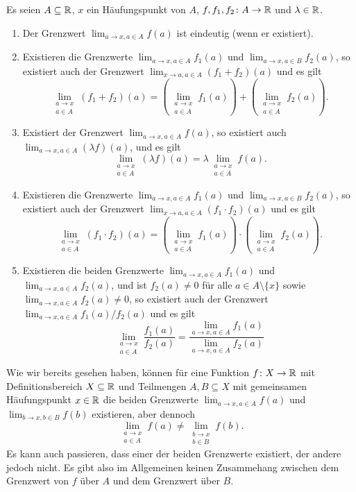 \documentclass[a4paper,10pt]{article}
\begin{document}
\begin{prop}
 Es seien $A \subseteq \mathbb{R}$, $x$ ein Häufungspunkt von $A$, $f, f_1, f_2 \colon A \to \mathbb{R}$ und $\lambda \in \mathbb{R}$.
 \begin{enumerate}
  \item
   Der Grenzwert $\lim_{a \to x, a \in A} f(a)$ ist eindeutig (wenn er existiert).
  \item
   Existieren die Grenzwerte $\lim_{a \to x, a \in A} f_1(a)$ und $\lim_{a \to x, a \in B} f_2(a)$, so existiert auch der Grenzwert $\lim_{x \to a, a \in A} (f_1 + f_2)(a)$ und es gilt
   \[
    \lim_{\substack{a \to x \\ a \in A}} (f_1 + f_2)(a)
    =
    \left( \lim_{\substack{a \to x \\ a \in A}} f_1(a) \right)
    + \left( \lim_{\substack{a \to x \\ a \in A}} f_2(a) \right).
   \]
  \item
   Existiert der Grenzwert $\lim_{a \to x, a \in A} f(a)$, so existiert auch $\lim_{a \to x, a \in A} (\lambda f)(a)$, und es gilt
   \[
    \lim_{\substack{a \to x \\ a \in A}} (\lambda f)(a)
    = \lambda \lim_{\substack{a \to x \\ a \in A}} f(a).
   \]
  \item
   Existieren die Grenzwerte $\lim_{a \to x, a \in A} f_1(a)$ und $\lim_{a \to x, a \in B} f_2(a)$, so existiert auch der Grenzwert $\lim_{x \to a, a \in A} (f_1 \cdot f_2)(a)$ und es gilt
   \[
    \lim_{\substack{a \to x \\ a \in A}} (f_1 \cdot f_2)(a)
    =
    \left( \lim_{\substack{a \to x \\ a \in A}} f_1(a) \right)
    \cdot \left( \lim_{\substack{a \to x \\ a \in A}} f_2(a) \right).
   \]
  \item
   Existieren die beiden Grenzwerte $\lim_{a \to x, a \in A} f_1(a)$ und $\lim_{a \to x, a \in A} f_2(a)$, und ist \mbox{$f_2(a) \neq 0$} für alle $a \in A \setminus \{x\}$ sowie $\lim_{a \to x, a \in A} f_2(a) \neq 0$, so existiert auch der Grenzwert $\lim_{a \to x, a \in A} f_1(a)/f_2(a)$ und es gilt
   \[
    \lim_{\substack{a \to x \\ a \in A}} \frac{f_1(a)}{f_2(a)}
    = \frac{\lim_{a \to x, a \in A} f_1(a)}{\lim_{a \to x, a \in A} f_2(a)}
   \]
 \end{enumerate}
\end{prop}


Wie wir bereits gesehen haben, können für eine Funktion $f \colon X \to \mathbb{R}$ mit Definitionsbereich $X \subseteq \mathbb{R}$ und Teilmengen $A, B \subseteq X$ mit gemeinsamen Häufungspunkt $x \in \mathbb{R}$ die beiden Grenzwerte $\lim_{a \to x, a \in A} f(a)$ und $\lim_{b \to x, b \in B} f(b)$ existieren, aber dennoch
\[
 \lim_{\substack{a \to x \\ a \in A}} f(a)
 \neq
 \lim_{\substack{b \to x \\ b \in B}} f(b).
\]
Es kann auch passieren, dass einer der beiden Grenzwerte existiert, der andere jedoch nicht. Es gibt also im Allgemeinen keinen Zusammehang zwischen dem Grenzwert von $f$ über $A$ und dem Grenzwert über $B$.
\end{document}
